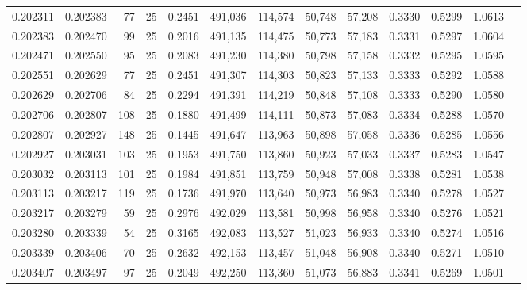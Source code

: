 \begin{tabular}{rrrrrrrrrrrrr}
0.202311 & 0.202383 &    77 &  25 &                                     0.2451 & 491,036 & 114,574 &  50,748 &  57,208 & 0.3330 & 0.5299 & 1.0613 \\
0.202383 & 0.202470 &    99 &  25 &                                     0.2016 & 491,135 & 114,475 &  50,773 &  57,183 & 0.3331 & 0.5297 & 1.0604 \\
0.202471 & 0.202550 &    95 &  25 &                                     0.2083 & 491,230 & 114,380 &  50,798 &  57,158 & 0.3332 & 0.5295 & 1.0595 \\
0.202551 & 0.202629 &    77 &  25 &                                     0.2451 & 491,307 & 114,303 &  50,823 &  57,133 & 0.3333 & 0.5292 & 1.0588 \\
0.202629 & 0.202706 &    84 &  25 &                                     0.2294 & 491,391 & 114,219 &  50,848 &  57,108 & 0.3333 & 0.5290 & 1.0580 \\
0.202706 & 0.202807 &   108 &  25 &                                     0.1880 & 491,499 & 114,111 &  50,873 &  57,083 & 0.3334 & 0.5288 & 1.0570 \\
0.202807 & 0.202927 &   148 &  25 &                                     0.1445 & 491,647 & 113,963 &  50,898 &  57,058 & 0.3336 & 0.5285 & 1.0556 \\
0.202927 & 0.203031 &   103 &  25 &                                     0.1953 & 491,750 & 113,860 &  50,923 &  57,033 & 0.3337 & 0.5283 & 1.0547 \\
0.203032 & 0.203113 &   101 &  25 &                                     0.1984 & 491,851 & 113,759 &  50,948 &  57,008 & 0.3338 & 0.5281 & 1.0538 \\
0.203113 & 0.203217 &   119 &  25 &                                     0.1736 & 491,970 & 113,640 &  50,973 &  56,983 & 0.3340 & 0.5278 & 1.0527 \\
0.203217 & 0.203279 &    59 &  25 &                                     0.2976 & 492,029 & 113,581 &  50,998 &  56,958 & 0.3340 & 0.5276 & 1.0521 \\
0.203280 & 0.203339 &    54 &  25 &                                     0.3165 & 492,083 & 113,527 &  51,023 &  56,933 & 0.3340 & 0.5274 & 1.0516 \\
0.203339 & 0.203406 &    70 &  25 &                                     0.2632 & 492,153 & 113,457 &  51,048 &  56,908 & 0.3340 & 0.5271 & 1.0510 \\
0.203407 & 0.203497 &    97 &  25 &                                     0.2049 & 492,250 & 113,360 &  51,073 &  56,883 & 0.3341 & 0.5269 & 1.0501 \\

\end{tabular}
